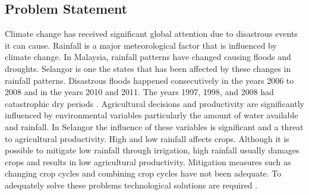 \documentclass{article}
\begin{document}
\subsection{Problem Statement}
Climate change has received significant global attention due to disastrous events it can
cause. Rainfall is a major meteorological factor that is influenced by climate change. In
Malaysia, rainfall patterns have changed causing floods and droughts. Selangor is one the states
that has been affected by these changes in rainfall patterns. Disastrous floods happened
consecutively in the years 2006 to 2008 and in the years 2010 and 2011. The years 1997, 1998,
and 2008 had catastrophic dry periods \cite{talib_et_al_2024}. Agricultural decisions and
productivity are significantly influenced by environmental variables particularly the amount of
water available and rainfall. In Selangor the influence of these variables is significant and a
threat to agricultural productivity. High and low rainfall affects crops. Although it is possible
to mitigate low rainfall through irrigation, high rainfall usually damages crops and results in
low agricultural productivity. Mitigation measures such as changing crop cycles and combining
crop cycles have not been adequate. To adequately solve these problems technological
solutions are required \cite{alam_2021}.
\end{document}
